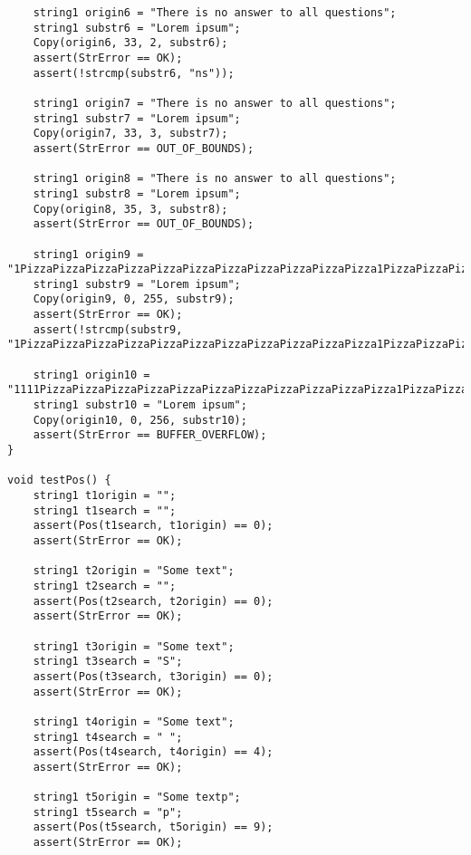 \documentclass[a4paper,14pt]{extarticle}
\begin{document}
\begin{enumerate}
\begin{verbatim}
    string1 origin6 = "There is no answer to all questions";
    string1 substr6 = "Lorem ipsum";
    Copy(origin6, 33, 2, substr6);
    assert(StrError == OK);
    assert(!strcmp(substr6, "ns"));

    string1 origin7 = "There is no answer to all questions";
    string1 substr7 = "Lorem ipsum";
    Copy(origin7, 33, 3, substr7);
    assert(StrError == OUT_OF_BOUNDS);

    string1 origin8 = "There is no answer to all questions";
    string1 substr8 = "Lorem ipsum";
    Copy(origin8, 35, 3, substr8);
    assert(StrError == OUT_OF_BOUNDS);

    string1 origin9 = "1PizzaPizzaPizzaPizzaPizzaPizzaPizzaPizzaPizzaPizzaPizza1PizzaPizzaPizzaPizzaPizzaPizzaPizzaPizzaPizzaPizzaPizza1PizzaPizzaPizzaPizzaPizzaPizzaPizzaPizzaPizzaPizzaPizza1PizzaPizzaPizzaPizzaPizzaPizzaPizzaPizzaPizzaPizzaPizzaPizzaPizzaPizzaPizzaPizzaPizzaa";
    string1 substr9 = "Lorem ipsum";
    Copy(origin9, 0, 255, substr9);
    assert(StrError == OK);
    assert(!strcmp(substr9, "1PizzaPizzaPizzaPizzaPizzaPizzaPizzaPizzaPizzaPizzaPizza1PizzaPizzaPizzaPizzaPizzaPizzaPizzaPizzaPizzaPizzaPizza1PizzaPizzaPizzaPizzaPizzaPizzaPizzaPizzaPizzaPizzaPizza1PizzaPizzaPizzaPizzaPizzaPizzaPizzaPizzaPizzaPizzaPizzaPizzaPizzaPizzaPizzaPizzaPizzaa"));
    
    string1 origin10 = "1111PizzaPizzaPizzaPizzaPizzaPizzaPizzaPizzaPizzaPizzaPizza1PizzaPizzaPizzaPizzaPizzaPizzaPizzaPizzaPizzaPizzaPizza1PizzaPizzaPizzaPizzaPizzaPizzaPizzaPizzaPizzaPizzaPizza1PizzaPizzaPizzaPizzaPizzaPizzaPizzaPizzaPizzaPizzaPizzaPizzaPizzaPizzaPizzaPizzaPizza";
    string1 substr10 = "Lorem ipsum";
    Copy(origin10, 0, 256, substr10);
    assert(StrError == BUFFER_OVERFLOW);
}

void testPos() {
    string1 t1origin = "";
    string1 t1search = "";
    assert(Pos(t1search, t1origin) == 0);
    assert(StrError == OK);

    string1 t2origin = "Some text";
    string1 t2search = "";
    assert(Pos(t2search, t2origin) == 0);
    assert(StrError == OK);

    string1 t3origin = "Some text";
    string1 t3search = "S";
    assert(Pos(t3search, t3origin) == 0);
    assert(StrError == OK);

    string1 t4origin = "Some text";
    string1 t4search = " ";
    assert(Pos(t4search, t4origin) == 4);
    assert(StrError == OK);

    string1 t5origin = "Some textp";
    string1 t5search = "p";
    assert(Pos(t5search, t5origin) == 9);
    assert(StrError == OK);


\end{verbatim}
\end{enumerate}
\end{document}
